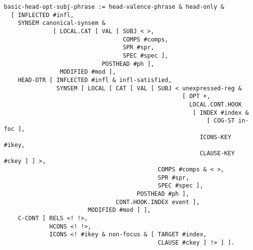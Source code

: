 \documentclass[a4paper]{article}
\begin{document}
{\small\begin{verbatim}
basic-head-opt-subj-phrase := head-valence-phrase & head-only &
  [ INFLECTED #infl,
    SYNSEM canonical-synsem &
              [ LOCAL.CAT [ VAL [ SUBJ < >,
                                  COMPS #comps,
                                  SPR #spr,
                                  SPEC #spec ],
                            POSTHEAD #ph ],
                MODIFIED #mod ],
    HEAD-DTR [ INFLECTED #infl & infl-satisfied,
               SYNSEM [ LOCAL [ CAT [ VAL [ SUBJ < unexpressed-reg &
                                                   [ OPT +,
                                                     LOCAL.CONT.HOOK 
                                                      [ INDEX #index & 
                                                          [ COG-ST in-foc ],
                                                        ICONS-KEY #ikey,
                                                        CLAUSE-KEY #ckey ] ] >,
                                            COMPS #comps & < >,
                                            SPR #spr,
                                            SPEC #spec ],
                                      POSTHEAD #ph ],
                                CONT.HOOK.INDEX event ],
                        MODIFIED #mod ] ],
    C-CONT [ RELS <! !>,
             HCONS <! !>,
             ICONS <! #ikey & non-focus & [ TARGET #index,
                                            CLAUSE #ckey ] !> ] ].
\end{verbatim}}
\end{document}
